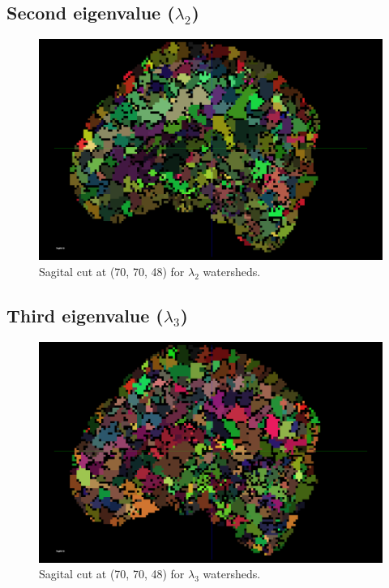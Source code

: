 \documentclass[a4paper,11pt]{report}
\begin{document}
    \subsection{Second eigenvalue ($\lambda_2$)}
    \begin{figure}[H]
      \includegraphics[width=1\linewidth]{imgs/e2_watersheds.png}
      \caption{Sagital cut at (70, 70, 48) for $\lambda_2$ watersheds.}
      \label{fig:e2_watersheds}
    \end{figure}

    \subsection{Third eigenvalue ($\lambda_3$)}
    \begin{figure}[H]
      \includegraphics[width=1\linewidth]{imgs/e3_watersheds.png}
      \caption{Sagital cut at (70, 70, 48) for $\lambda_3$ watersheds.}
      \label{fig:e3_watersheds}
    \end{figure}
\end{document}
